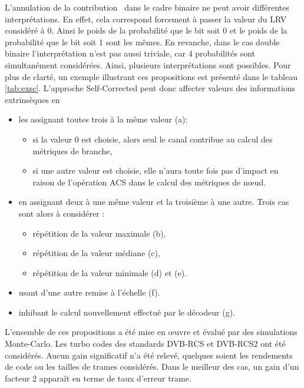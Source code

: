 \og L'annulation de la contribution \fg ~dans le cadre binaire ne peut avoir différentes interprétations. En effet, cela 
correspond forcement à passer la valeur du LRV considéré à 0. Ainsi le poids de la probabilité que le bit soit 0 et 
le poids de la probabilité que le bit soit 1 sont les mêmes. En revanche, dans le cas double binaire l'interprétation n'est 
pas aussi triviale, car 4 probabilités sont simultanément considérées. Ainsi, plusieurs interprétations sont possibles. Pour plus 
de clarté, un exemple illustrant ces propositions est présenté dans le tableau \ref{tab:exsc}. L'approche Self-Corrected 
peut donc affecter valeurs des informations extrinsèques en 
\begin{itemize}
	\item les assignant toutes trois à la même valeur (a):
	\begin{itemize}
		\item si la valeur 0 est choisie, alors seul le canal contribue au calcul des métriques de branche,
		\item si une autre valeur est choisie, elle n'aura toute fois pas d'impact en raison de l’opération 
		ACS dans le calcul des métriques de nœud.
	\end{itemize}
	\item en assignant deux à une même valeur et la troisième à une autre. Trois cas sont alors à considérer :
	\begin{itemize}
		\item répétition de la valeur maximale (b),
		\item répétition de la valeur médiane (c),
		\item répétition de la valeur minimale (d) et (e).
	\end{itemize}
	\item usant d'une autre remise à l'échelle (f).
	\item inhibant le calcul nouvellement effectué par le décodeur (g).\\
\end{itemize}

L'ensemble de ces propositions a été mise en œuvre et évalué par des simulations Monte-Carlo. Les turbo codes des standards 
DVB-RCS et DVB-RCS2 ont été considérés. Aucun gain significatif n'a été relevé, quelques soient les rendements de code ou les tailles de 
trames considérés. Dans le meilleur des cas, un gain d'un facteur 2 apparaît en terme de taux d'erreur trame. 

